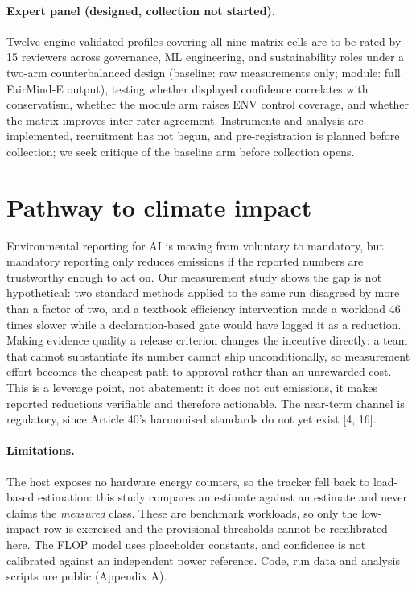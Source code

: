 \documentclass{article}
\newcommand{\sysname}{FairMind-E}
\begin{document}
\paragraph{Expert panel (designed, collection not started).} Twelve
engine-validated profiles covering all nine matrix cells are to be rated by 15
reviewers across
governance, ML engineering, and sustainability roles under a two-arm
counterbalanced design (baseline: raw measurements only; module: full
\sysname{} output), testing whether displayed confidence correlates with
conservatism, whether the module arm raises ENV control coverage, and whether
the matrix improves inter-rater agreement. Instruments and analysis are
implemented, recruitment has not begun, and pre-registration is planned before
collection; we seek critique of the baseline arm before collection opens.

\section{Pathway to climate impact}

Environmental reporting for AI is moving from voluntary to mandatory, but
mandatory reporting only reduces emissions if the reported numbers are
trustworthy enough to act on. Our measurement study shows the gap is not
hypothetical: two standard methods applied to the same run disagreed by more
than a factor of two, and a textbook efficiency intervention made a workload 46
times slower while a declaration-based gate would have logged it as a
reduction. Making evidence quality a release criterion changes the incentive directly: a
team that cannot substantiate its number cannot ship unconditionally, so
measurement effort becomes the cheapest path to approval rather than an
unrewarded cost. This is a leverage point, not abatement: it does not cut
emissions, it makes reported reductions verifiable and therefore actionable.
The near-term channel is regulatory, since Article 40's harmonised standards do
not yet exist [4, 16].

\paragraph{Limitations.} The host exposes no hardware energy counters, so the
tracker fell back to load-based estimation: this study compares an estimate
against an estimate and never claims the \emph{measured} class. These are
benchmark workloads, so only the low-impact row is exercised and the
provisional thresholds cannot be recalibrated here. The FLOP model uses
placeholder constants, and confidence is not calibrated against an independent
power reference. Code, run data and analysis scripts are public (Appendix A).
\end{document}
